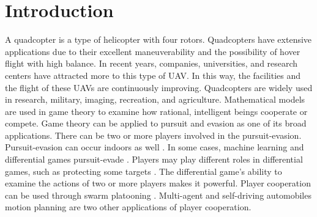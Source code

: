 \documentclass[conference]{IEEEtran}
\begin{document}
\section{Introduction}
A quadcopter is a type of helicopter with four rotors. %
Quadcopters have extensive applications due to their excellent maneuverability and the possibility of hover flight with high balance.
In recent years, companies, universities, and research centers have attracted more to this type of UAV.
In this way, the facilities and the flight of these UAVs are continuously improving.
Quadcopters are widely used in research, military, imaging, recreation, and agriculture.
Mathematical models are used in game theory to examine how rational, intelligent beings cooperate or compete.
Game theory can be applied to pursuit and evasion as one of its broad
applications.
There can be two \cite{b1} or more players \cite{b2} involved in the pursuit-evasion.
Pursuit-evasion can occur indoors as well \cite{b3}.
In some cases, machine learning and differential games pursuit-evade \cite{b4}.
Players may play different roles in differential games, such as protecting some targets \cite{b5}.
The differential game's ability to examine the actions of two or more players makes it powerful.
Player cooperation can be used through swarm platooning \cite{b6}.
Multi-agent \cite{b7} and self-driving automobiles \cite{b8} motion planning are two other applications of player cooperation.
\end{document}
